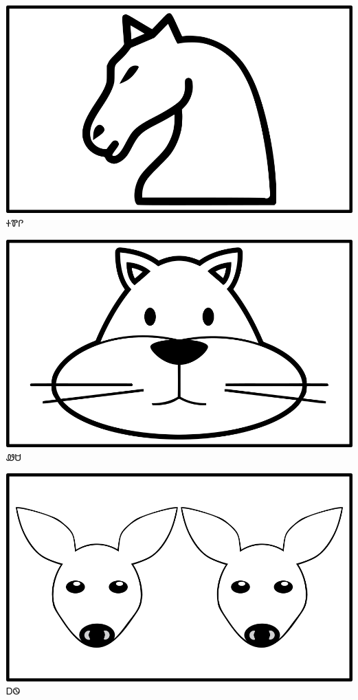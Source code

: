 \documentclass[avery5371]{flashcards}%
\begin{document}
\begin{flashcard}{
\includegraphics[width=0.95\columnwidth,height=.51\columnwidth,keepaspectratio]{../artwork/objects-animate/soquili}
}\Huge ᏐᏈᎵ
\end{flashcard}

\begin{flashcard}{
\includegraphics[width=0.95\columnwidth,height=.51\columnwidth,keepaspectratio]{../artwork/objects-animate/wesa}
}\Huge ᏪᏌ
\end{flashcard}

\begin{flashcard}{
\includegraphics[width=0.95\columnwidth,height=.51\columnwidth,keepaspectratio]{../artwork/objects-animate/anitali-ahwi}
}\Huge ᎠᏫ
\end{flashcard}
\end{document}
